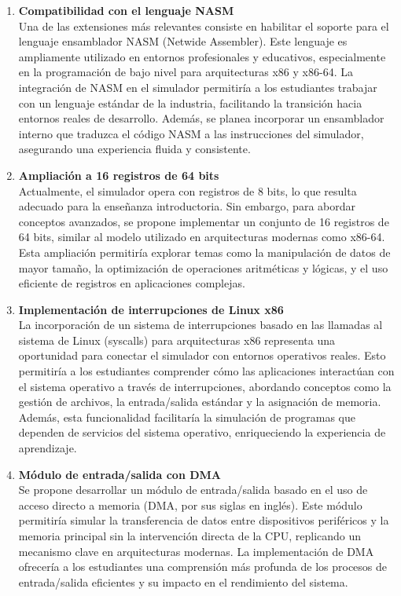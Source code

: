 \documentclass[12pt,oneside]{templates/unerthesis}
\begin{document}
\begin{enumerate}
\def\labelenumi{\arabic{enumi}.}
\item
  \textbf{Compatibilidad con el lenguaje NASM}\\
  Una de las extensiones más relevantes consiste en habilitar el soporte para el lenguaje ensamblador NASM (Netwide Assembler). Este lenguaje es ampliamente utilizado en entornos profesionales y educativos, especialmente en la programación de bajo nivel para arquitecturas x86 y x86-64. La integración de NASM en el simulador permitiría a los estudiantes trabajar con un lenguaje estándar de la industria, facilitando la transición hacia entornos reales de desarrollo. Además, se planea incorporar un ensamblador interno que traduzca el código NASM a las instrucciones del simulador, asegurando una experiencia fluida y consistente.
\item
  \textbf{Ampliación a 16 registros de 64 bits}\\
  Actualmente, el simulador opera con registros de 8 bits, lo que resulta adecuado para la enseñanza introductoria. Sin embargo, para abordar conceptos avanzados, se propone implementar un conjunto de 16 registros de 64 bits, similar al modelo utilizado en arquitecturas modernas como x86-64. Esta ampliación permitiría explorar temas como la manipulación de datos de mayor tamaño, la optimización de operaciones aritméticas y lógicas, y el uso eficiente de registros en aplicaciones complejas.
\item
  \textbf{Implementación de interrupciones de Linux x86}\\
  La incorporación de un sistema de interrupciones basado en las llamadas al sistema de Linux (syscalls) para arquitecturas x86 representa una oportunidad para conectar el simulador con entornos operativos reales. Esto permitiría a los estudiantes comprender cómo las aplicaciones interactúan con el sistema operativo a través de interrupciones, abordando conceptos como la gestión de archivos, la entrada/salida estándar y la asignación de memoria. Además, esta funcionalidad facilitaría la simulación de programas que dependen de servicios del sistema operativo, enriqueciendo la experiencia de aprendizaje.
\item
  \textbf{Módulo de entrada/salida con DMA}\\
  Se propone desarrollar un módulo de entrada/salida basado en el uso de acceso directo a memoria (DMA, por sus siglas en inglés). Este módulo permitiría simular la transferencia de datos entre dispositivos periféricos y la memoria principal sin la intervención directa de la CPU, replicando un mecanismo clave en arquitecturas modernas. La implementación de DMA ofrecería a los estudiantes una comprensión más profunda de los procesos de entrada/salida eficientes y su impacto en el rendimiento del sistema.

\end{enumerate}
\end{document}
